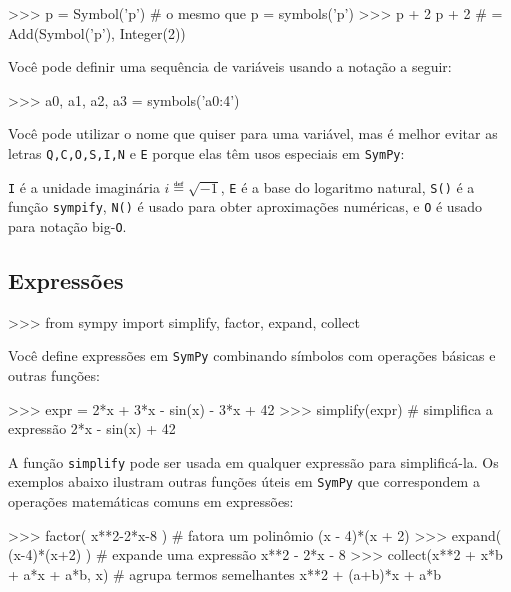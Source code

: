 \small
\begin{verbatimtab}
>>> p = Symbol('p')   # o mesmo que p = symbols('p')
>>> p + 2
p + 2                 # = Add(Symbol('p'), Integer(2))
\end{verbatimtab}
\normalsize


\printcp

\noindent
Você pode definir uma sequência de variáveis usando a notação a seguir:
\small
\begin{verbatimtab}
>>> a0, a1, a2, a3 = symbols('a0:4')
\end{verbatimtab}
\normalsize

\noindent
Você pode utilizar o nome que quiser para uma variável, mas é melhor evitar as letras \texttt{Q,C,O,S,I,N} e \texttt{E} porque elas têm usos especiais em \texttt{SymPy}:

\texttt{I} é a unidade imaginária $i\eqdef\sqrt{-1}$, 
\texttt{E} é a base do logaritmo natural,
\texttt{S()} é a função \texttt{sympify},
\texttt{N()} é usado para obter aproximações numéricas, e
\texttt{O} é usado para notação big-\texttt{O}.


\subsection{Expressões}
\label{basics:expressions}

\small
\begin{verbatimtab}
>>> from sympy import simplify, factor, expand, collect
\end{verbatimtab}
\normalsize

\noindent
Você define expressões em \texttt{SymPy} combinando símbolos com operações básicas e outras funções:

\small
\begin{verbatimtab}
>>> expr = 2*x + 3*x - sin(x) - 3*x + 42
>>> simplify(expr)                   # simplifica a expressão
2*x - sin(x) + 42
\end{verbatimtab}
\normalsize

\noindent
A função \texttt{simplify} pode ser usada em qualquer expressão para simplificá-la.
Os exemplos abaixo ilustram outras funções úteis em \texttt{SymPy} que correspondem a operações matemáticas comuns em expressões:

  

\small
\begin{verbatimtab}
>>> factor( x**2-2*x-8 )             # fatora um polinômio
(x - 4)*(x + 2)
>>> expand( (x-4)*(x+2) )            # expande uma expressão
x**2 - 2*x - 8
>>> collect(x**2 + x*b + a*x + a*b, x)    # agrupa termos semelhantes
x**2 + (a+b)*x + a*b
\end{verbatimtab}
\normalsize

